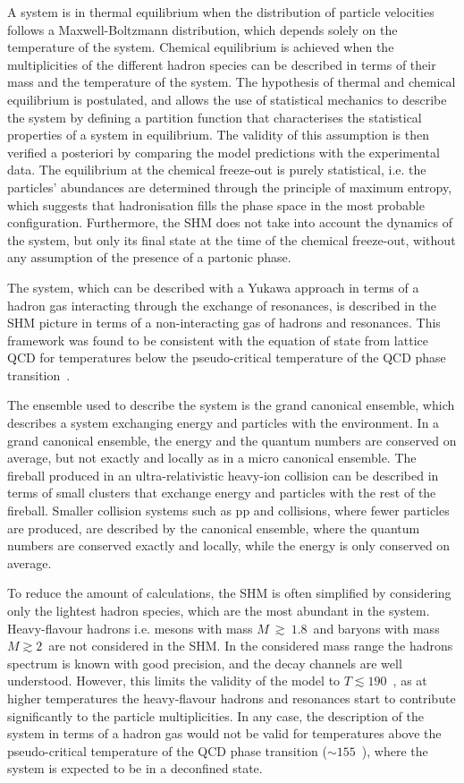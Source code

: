 A system is in thermal equilibrium when the distribution of particle velocities follows a Maxwell-Boltzmann distribution, which depends solely on the temperature of the system. Chemical equilibrium is achieved when the multiplicities of the different hadron species can be described in terms of their mass and the temperature of the system. The hypothesis of thermal and chemical equilibrium is postulated, and allows the use of statistical mechanics to describe the system by defining a partition function that characterises the statistical properties of a system in equilibrium. The validity of this assumption is then verified a posteriori by comparing the model predictions with the experimental data. The equilibrium at the chemical freeze-out is purely statistical, i.e. the particles' abundances are determined through the principle of maximum entropy, which suggests that hadronisation fills the phase space in the most probable configuration. Furthermore, the SHM does not take into account the dynamics of the system, but only its final state at the time of the chemical freeze-out, without any assumption of the presence of a partonic phase. 

The system, which can be described with a Yukawa approach in terms of a hadron gas interacting through the exchange of resonances, is described in the SHM picture in terms of a non-interacting gas of hadrons and resonances. This framework was found to be consistent with the equation of state from lattice QCD for temperatures below the pseudo-critical temperature of the QCD phase transition~\cite{HotQCD:2014kol}. 

The ensemble used to describe the system is the grand canonical ensemble, which describes a system exchanging energy and particles with the environment. In a grand canonical ensemble, the energy and the quantum numbers are conserved on average, but not exactly and locally as in a micro canonical ensemble. The fireball produced in an ultra-relativistic heavy-ion collision can be described in terms of small clusters that exchange energy and particles with the rest of the fireball. Smaller collision systems such as pp and \ee collisions, where fewer particles are produced, are described by the canonical ensemble, where the quantum numbers are conserved exactly and locally, while the energy is only conserved on average.

To reduce the amount of calculations, the SHM is often simplified by considering only the lightest hadron species, which are the most abundant in the system. Heavy-flavour hadrons i.e. mesons with mass $M~\gtrsim~1.8$~\gevcc and baryons with mass $M \gtrsim 2$~\gevcc are not considered in the SHM. In the considered mass range the hadrons spectrum is known with good precision, and the decay channels are well understood. However, this limits the validity of the model to $T\lesssim 190$~\mev, as at higher temperatures the heavy-flavour hadrons and resonances start to contribute significantly to the particle multiplicities. In any case, the description of the system in terms of a hadron gas would not be valid for temperatures above the pseudo-critical temperature of the QCD phase transition ($\sim155$~\mev), where the system is expected to be in a deconfined state.

